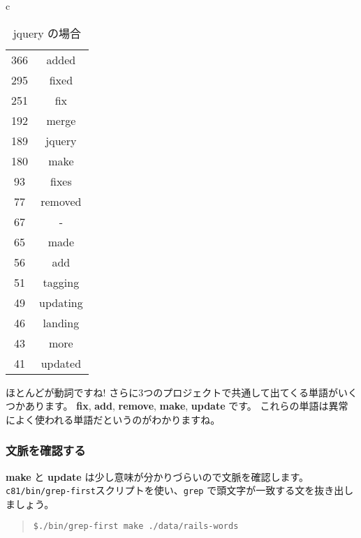 \documentclass{jarticle}
\begin{document}
\begin{table}[htbp]
\begin{center}
\begin{tabular}{c}
     \begin{minipage}{0.3\hsize}
      \begin{center}
       \caption{jquery の場合}
       \begin{tabular}{c|c}
        \hline
        366 & added \\
        295 & fixed \\
        251 & fix \\
        192 & merge \\
        189 & jquery \\
        180 & make \\
        93 & fixes \\
        77 & removed \\
        67 & - \\
        65 & made \\
        56 & add \\
        51 & tagging \\
        49 & updating \\
        46 & landing \\
        43 & more \\
        41 & updated \\
        \hline
       \end{tabular}
      \end{center}
     \end{minipage}

    \end{tabular}
   \end{center}
  \end{table}

  ほとんどが動詞ですね!
  さらに3つのプロジェクトで共通して出てくる単語がいくつかあります。
  {\bf fix}, {\bf add}, {\bf remove}, {\bf make}, {\bf update} です。
  これらの単語は異常によく使われる単語だというのがわかりますね。

   \subsubsection{文脈を確認する}

   {\bf make} と {\bf update} は少し意味が分かりづらいので文脈を確認します。
   {\tt c81/bin/grep-first}スクリプトを使い、{\tt grep} で頭文字が一致する文を抜き出しましょう。

   \begin{quote}
    {\tt \$./bin/grep-first make ./data/rails-words }
   \end{quote}
\end{document}
